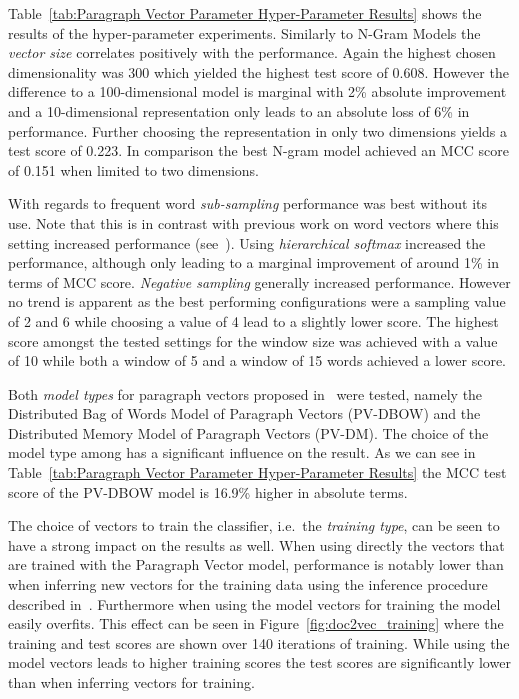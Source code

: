 Table~\ref{tab:Paragraph Vector Parameter Hyper-Parameter Results} shows the results of the hyper-parameter experiments. Similarly to N-Gram Models the \emph{vector size} correlates positively with the performance. Again the highest chosen dimensionality was 300 which yielded the highest test score of 0.608. However the difference to a 100-dimensional model is marginal with 2\% absolute improvement and a 10-dimensional representation only leads to an absolute loss of 6\% in performance. Further choosing the representation in only two dimensions yields a test score of 0.223. In comparison the best N-gram model achieved an \gls{MCC} score of 0.151 when limited to two dimensions.

With regards to frequent word \emph{sub-sampling} performance was best without its use. Note that this is in contrast with previous work on word vectors where this setting increased performance (see~\cite{Mikolov:2013ab}). Using \emph{hierarchical softmax} increased the performance, although only leading to a marginal improvement of around 1\% in terms of MCC score. \emph{Negative sampling} generally increased performance. However no trend is apparent as the best performing configurations were a sampling value of 2 and 6 while choosing a value of 4 lead to a slightly lower score. The highest score amongst the tested settings for the window size was achieved with a value of 10 while both a window of 5 and a window of 15 words achieved a lower score.

Both \emph{model types} for paragraph vectors proposed in~\cite{Le:2014aa} were tested, namely the Distributed Bag of Words Model of Paragraph Vectors (PV-DBOW) and the Distributed Memory Model of Paragraph Vectors (PV-DM). The choice of the model type among has a significant influence on the result. As we can see in Table~\ref{tab:Paragraph Vector Parameter Hyper-Parameter Results} the \gls{MCC} test score of the PV-DBOW model is 16.9\% higher in absolute terms.

The choice of vectors to train the classifier, i.e.\ the \emph{training type}, can be seen to have a strong impact on the results as well. When using directly the vectors that are trained with the Paragraph Vector model, performance is notably lower than when inferring new vectors for the training data using the inference procedure described in~\cite{Le:2014aa}. Furthermore when using the model vectors for training the model easily overfits. This effect can be seen in Figure~\ref{fig:doc2vec_training} where the training and test scores are shown over 140 iterations of training. While using the model vectors leads to higher training scores the test scores are significantly lower than when inferring vectors for training.

